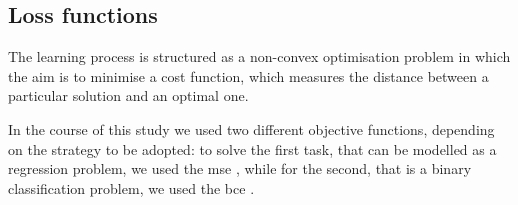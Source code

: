 %
%
%
%
%
%

\subsection{Loss functions}
\label{subsec:lossfunctions}
The learning process is structured as a non-convex optimisation problem in which 
the aim is to minimise a cost function, which measures the distance between a 
particular solution and an optimal one.

In the course of this study we used two different objective functions, depending 
on the strategy to be adopted: to solve the first task, that can be modelled as a 
regression problem, we used the \gls{mse} \cite[][]{wang2009mean}, while for the 
second, that is a binary classification problem, we used the \gls{bce} 
\cite[][]{gomez2018understanding}.

